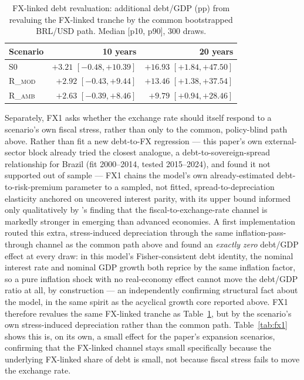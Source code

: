 \documentclass[11pt,a4paper]{article}
\begin{document}
\begin{table}[htbp]
\centering\small
\caption{FX-linked debt revaluation: additional debt/GDP (pp) from revaluing the FX-linked tranche by the common bootstrapped BRL/USD path. Median [p10, p90], 300 draws.}
\label{tab:dc1}
\begin{tabular}{lrr}
\toprule
Scenario & 10 years & 20 years \\
\midrule
\textsc{S0} & $+3.21$ $[-0.48,+10.39]$ & $+16.93$ $[+1.84,+47.50]$ \\
\textsc{R\_mod} & $+2.92$ $[-0.43,+9.44]$ & $+13.46$ $[+1.38,+37.54]$ \\
\textsc{R\_amb} & $+2.63$ $[-0.39,+8.46]$ & $+9.79$ $[+0.94,+28.46]$ \\
\bottomrule
\end{tabular}
\end{table}

Separately, FX1 asks whether the exchange rate should itself respond to a scenario's own fiscal stress, rather than only to the common, policy-blind path above. Rather than fit a new debt-to-FX regression --- this paper's own external-sector block already tried the closest analogue, a debt-to-sovereign-spread relationship for Brazil (fit 2000--2014, tested 2015--2024), and found it not supported out of sample --- FX1 chains the model's own already-estimated debt-to-risk-premium parameter \citep{baldaccikumar2010} to a sampled, not fitted, spread-to-depreciation elasticity anchored on uncovered interest parity, with its upper bound informed only qualitatively by \citet{banerjeemehrotrazampolli2023}'s finding that the fiscal-to-exchange-rate channel is markedly stronger in emerging than advanced economies. A first implementation routed this extra, stress-induced depreciation through the same inflation-pass-through channel as the common path above and found an \emph{exactly zero} debt/GDP effect at every draw: in this model's Fisher-consistent debt identity, the nominal interest rate and nominal GDP growth both reprice by the same inflation factor, so a pure inflation shock with no real-economy effect cannot move the debt/GDP ratio at all, by construction --- an independently confirming structural fact about the model, in the same spirit as the acyclical growth core reported above. FX1 therefore revalues the same FX-linked tranche as Table~\ref{tab:dc1}, but by the scenario's own stress-induced depreciation rather than the common path. Table~\ref{tab:fx1} shows this is, on its own, a small effect for the paper's expansion scenarios, confirming that the FX-linked channel stays small specifically because the underlying FX-linked share of debt is small, not because fiscal stress fails to move the exchange rate.
\end{document}
